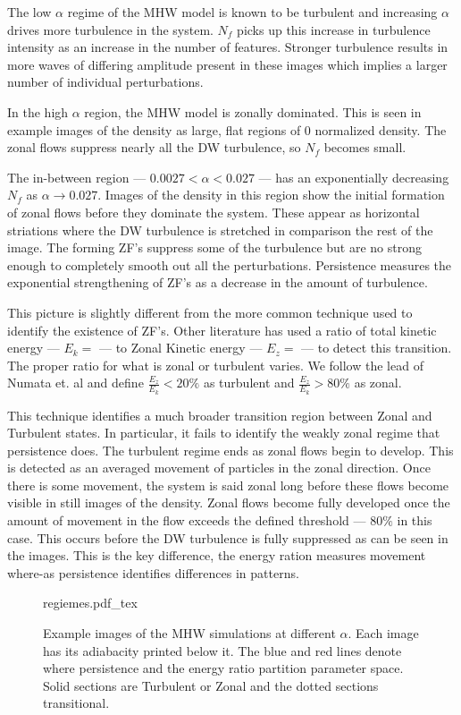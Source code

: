 \documentclass[pdflatex,sn-aps]{sn-jnl}%
\newcommand{\incfig}[1]{%
    \def\svgwidth{\columnwidth}
    {#1.pdf_tex}
}
\theoremstyle{thmstyleone}%
\theoremstyle{thmstyletwo}%
\theoremstyle{thmstylethree}%
\begin{document}
    \par
    The low $\alpha$ regime of the MHW model is known to be turbulent and increasing $\alpha$ drives more turbulence in the system.  $N_f$ picks up this increase in turbulence intensity as an increase in the number of features.  Stronger turbulence results in more waves of differing amplitude present in these images which implies a larger number of individual perturbations.  
    \par
    In the high $\alpha$ region, the MHW model is zonally dominated.  This is seen in example images of the density as large, flat regions of $0$ normalized density.  The zonal flows suppress nearly all the DW turbulence, so $N_f$ becomes small.  
    \par
    The in-between region --- $0.0027 < \alpha < 0.027$ --- has an exponentially decreasing $N_f$ as $\alpha \to 0.027$.  Images of the density in this region show the initial formation of zonal flows before they dominate the system.  These appear as horizontal striations where the DW turbulence is stretched in comparison the rest of the image.  The forming ZF's suppress some of the turbulence but are no strong enough to completely smooth out all the perturbations.  Persistence measures the exponential strengthening of ZF's as a decrease in the amount of turbulence.
    \par 
    This picture is slightly different from the more common technique used to identify the existence of ZF's.  Other literature has used a ratio of total kinetic energy --- $E_k =$ --- to Zonal Kinetic energy --- $E_z = $ --- to detect this transition.  The proper ratio for what is zonal or turbulent varies.  We follow the lead of Numata et. al\cite{NUMATA2007} and define $\frac{E_z}{E_k} < 20 \%$ as turbulent and $\frac{E_z}{E_k} > 80 \%$ as zonal.  
    \par
    This technique identifies a much broader transition region between Zonal and Turbulent states.  In particular, it fails to identify the weakly zonal regime that persistence does.  The turbulent regime ends as zonal flows begin to develop.  This is detected as an averaged movement of particles in the zonal direction.  Once there is some movement, the system is said zonal long before these flows become visible in still images of the density.  Zonal flows become fully developed once the amount of movement in the flow exceeds the defined threshold --- $80\%$ in this case.  This occurs before the DW turbulence is fully suppressed as can be seen in the images.  This is the key difference, the energy ration measures movement where-as persistence identifies differences in patterns.  
    \begin{figure}[h]
        \centering
        \incfig{regiemes}
        \caption{Example images of the MHW simulations at different $\alpha$.  Each image has its adiabacity printed below it.  The blue and red lines denote where persistence and the energy ratio partition parameter space.  Solid sections are Turbulent or Zonal and the dotted sections transitional.}
        \label{fig:regimes}
    \end{figure}
\end{document}
